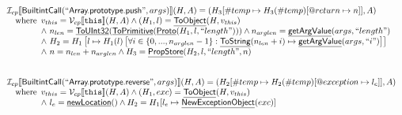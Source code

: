 \documentclass{article}
\makeatletter
\newcommand{\SF}[1]{\mbox{\textsf{#1}}}
\newcommand{\TT}[1]{\mbox{\texttt{#1}}}
\newcommand{\wherec}[1]{{\rm where}\begin{array}[t]{l}#1\end{array}}
\newcommand{\I}{\mathcal{I}}
\newcommand{\V}{\mathcal{V}}
\newcommand{\lbr}{\llbracket}
\newcommand{\rbr}{\rrbracket}
\newcommand{\hf}[1]{\underline{\sf #1}}
\newcommand{\varloc}[1]{\##1}
\newcommand{\varprop}[1]{@#1}
\makeatother
\begin{document}
\[\begin{array}{l}
\I _{cp}\lbr \SF{BuiltintCall}(``\SF{Array.prototype.push}",args)\rbr(H,A)
 = (H_3[\varloc{temp}\mapsto H_3(\varloc{temp})[\varprop{return}\mapsto n]], A) \\
\quad\wherec{
  v_{this} = \V _{cp}\lbr \TT{this}\rbr (H,A) \land (H_1,l) = \hf{ToObject}(H,v_{this})\\
  \land\ n_{len} = \hf{ToUInt32}(\hf{ToPrimitive}(\hf{Proto}(H_1, l, ``length")))
  \land n_{arglen} = \hf{getArgValue}(args, ``length")\\
  \land\ H_2 = H_1\left[ l \mapsto H_1(l)\left[\forall i \in \{0,...,n_{arglen}-1\}: 
    \hf{ToString}(n_{len}+i) \mapsto \hf{getArgValue}(args, ``i")\right]\right]\\
  \land\ n=n_{len} + n_{arglen}
  \land H_3 = \hf{PropStore}(H_2, l,``length", n)\\
  }\\
\\\\


\I _{cp}\lbr \SF{BuiltintCall}(``\SF{Array.prototype.reverse}",args)\rbr(H,A)
 = (H_2[\varloc{temp}\mapsto H_2(\varloc{temp})[\varprop{exception}\mapsto l_e]], A) \\
\quad\wherec{
  v_{this} = \V _{cp}\lbr \TT{this}\rbr (H,A) \land (H_1,exc) = \hf{ToObject}(H,v_{this})\\
  \land\ l_e = \hf{newLocation}() \land H_2=H_1[l_e\mapsto\hf{NewExceptionObject}(exc)] 
  }\\
  

\end{array}\]
\end{document}
